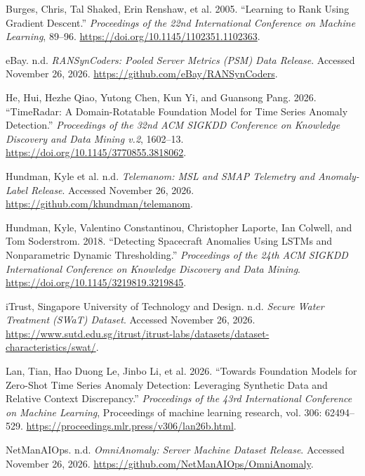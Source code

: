 \documentclass[
  english,
  10pt,
]{article}
\newlength{\cslhangindent}
\newenvironment{CSLReferences}[2] %
 {\begin{list}{}{%
  \setlength{\itemindent}{0pt}
  \setlength{\leftmargin}{0pt}
  \setlength{\parsep}{0pt}
  \ifodd #1
   \setlength{\leftmargin}{\cslhangindent}
   \setlength{\itemindent}{-1\cslhangindent}
  \fi
  \setlength{\itemsep}{#2\baselineskip}}}
 {\end{list}}
\begin{document}
\protect{}\label{refs}
\begin{CSLReferences}{1}{1}
Burges, Chris, Tal Shaked, Erin Renshaw, et al. 2005. {``Learning to
Rank Using Gradient Descent.''} \emph{Proceedings of the 22nd
International Conference on Machine Learning}, 89--96.
\url{https://doi.org/10.1145/1102351.1102363}.

{eBay}. n.d. \emph{{RANSynCoders}: Pooled Server Metrics ({PSM}) Data
Release}. Accessed November 26, 2026.
\url{https://github.com/eBay/RANSynCoders}.

He, Hui, Hezhe Qiao, Yutong Chen, Kun Yi, and Guansong Pang. 2026.
{``{TimeRadar}: A Domain-Rotatable Foundation Model for Time Series
Anomaly Detection.''} \emph{Proceedings of the 32nd ACM SIGKDD
Conference on Knowledge Discovery and Data Mining v.2}, 1602--13.
\url{https://doi.org/10.1145/3770855.3818062}.

{Hundman, Kyle et al.} n.d. \emph{{Telemanom}: MSL and SMAP Telemetry
and Anomaly-Label Release}. Accessed November 26, 2026.
\url{https://github.com/khundman/telemanom}.

Hundman, Kyle, Valentino Constantinou, Christopher Laporte, Ian Colwell,
and Tom Soderstrom. 2018. {``Detecting Spacecraft Anomalies Using LSTMs
and Nonparametric Dynamic Thresholding.''} \emph{Proceedings of the 24th
ACM SIGKDD International Conference on Knowledge Discovery and Data
Mining}. \url{https://doi.org/10.1145/3219819.3219845}.

{iTrust, Singapore University of Technology and Design}. n.d.
\emph{Secure Water Treatment ({SWaT}) Dataset}. Accessed November 26,
2026.
\url{https://www.sutd.edu.sg/itrust/itrust-labs/datasets/dataset-characteristics/swat/}.

Lan, Tian, Hao Duong Le, Jinbo Li, et al. 2026. {``Towards Foundation
Models for Zero-Shot Time Series Anomaly Detection: Leveraging Synthetic
Data and Relative Context Discrepancy.''} \emph{Proceedings of the 43rd
International Conference on Machine Learning}, Proceedings of machine
learning research, vol. 306: 62494--529.
\url{https://proceedings.mlr.press/v306/lan26b.html}.

NetManAIOps. n.d. \emph{{OmniAnomaly}: Server Machine Dataset Release}.
Accessed November 26, 2026.
\url{https://github.com/NetManAIOps/OmniAnomaly}.


\end{CSLReferences}
\end{document}
